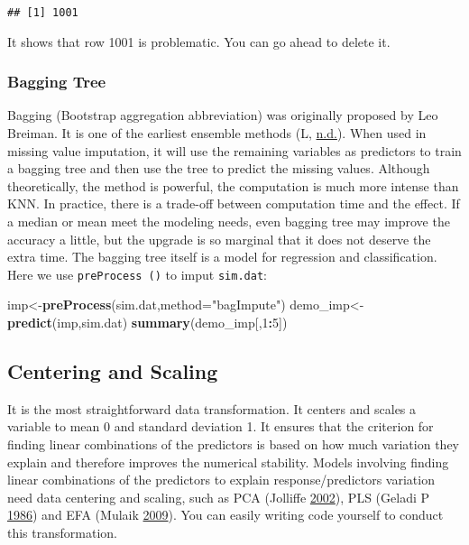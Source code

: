 \documentclass[
]{article}
\newenvironment{Shaded}{\begin{snugshade}}{\end{snugshade}}
\newcommand{\DataTypeTok}[1]{\textcolor[rgb]{0.13,0.29,0.53}{#1}}
\newcommand{\DecValTok}[1]{\textcolor[rgb]{0.00,0.00,0.81}{#1}}
\newcommand{\KeywordTok}[1]{\textcolor[rgb]{0.13,0.29,0.53}{\textbf{#1}}}
\newcommand{\NormalTok}[1]{#1}
\newcommand{\OperatorTok}[1]{\textcolor[rgb]{0.81,0.36,0.00}{\textbf{#1}}}
\newcommand{\StringTok}[1]{\textcolor[rgb]{0.31,0.60,0.02}{#1}}
\begin{document}
\begin{verbatim}
## [1] 1001
\end{verbatim}

It shows that row 1001 is problematic. You can go ahead to delete it.

\hypertarget{bagging-tree}{%
\subsubsection{Bagging Tree}\label{bagging-tree}}

Bagging (Bootstrap aggregation abbreviation) was originally proposed by
Leo Breiman. It is one of the earliest ensemble methods (L,
\protect\hyperlink{ref-bag1}{n.d.}). When used in missing value
imputation, it will use the remaining variables as predictors to train a
bagging tree and then use the tree to predict the missing values.
Although theoretically, the method is powerful, the computation is much
more intense than KNN. In practice, there is a trade-off between
computation time and the effect. If a median or mean meet the modeling
needs, even bagging tree may improve the accuracy a little, but the
upgrade is so marginal that it does not deserve the extra time. The
bagging tree itself is a model for regression and classification. Here
we use \texttt{preProcess\ ()} to imput \texttt{sim.dat}:

\begin{Shaded}
\begin{Highlighting}[]
\NormalTok{imp<-}\KeywordTok{preProcess}\NormalTok{(sim.dat,}\DataTypeTok{method=}\StringTok{"bagImpute"}\NormalTok{)}
\NormalTok{demo_imp<-}\KeywordTok{predict}\NormalTok{(imp,sim.dat)}
\KeywordTok{summary}\NormalTok{(demo_imp[,}\DecValTok{1}\OperatorTok{:}\DecValTok{5}\NormalTok{])}
\end{Highlighting}
\end{Shaded}

\hypertarget{centering-and-scaling}{%
\subsection{Centering and Scaling}\label{centering-and-scaling}}

It is the most straightforward data transformation. It centers and
scales a variable to mean 0 and standard deviation 1. It ensures that
the criterion for finding linear combinations of the predictors is based
on how much variation they explain and therefore improves the numerical
stability. Models involving finding linear combinations of the
predictors to explain response/predictors variation need data centering
and scaling, such as PCA (Jolliffe \protect\hyperlink{ref-pca1}{2002}),
PLS (Geladi P \protect\hyperlink{ref-PLS1}{1986}) and EFA (Mulaik
\protect\hyperlink{ref-EFA1}{2009}). You can easily writing code
yourself to conduct this transformation.
\end{document}
